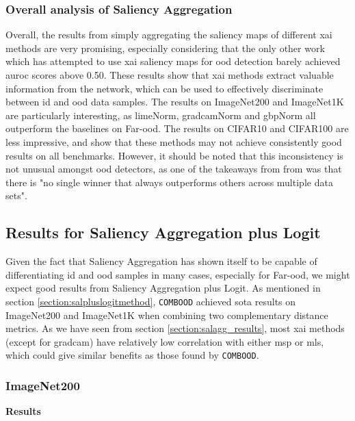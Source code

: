 \documentclass[UKenglish]{uiomasterthesis} %
\theoremstyle{definition}
\begin{document}
\subsubsection{Overall analysis of Saliency Aggregation}

Overall, the results from simply aggregating the saliency maps of different \ac{xai} methods are very promising, especially considering that the only other work which has attempted to use \ac{xai} saliency maps for \ac{ood} detection barely achieved \ac{auroc} scores above 0.50. These results show that \ac{xai} methods extract valuable information from the network, which can be used to effectively discriminate between \ac{id} and \ac{ood} data samples. The results on ImageNet200 and ImageNet1K are particularly interesting, as \ac{lime}Norm, \ac{gradcam}Norm and \ac{gbp}Norm all outperform the baselines on Far-\ac{ood}. The results on CIFAR10 and CIFAR100 are less impressive, and show that these methods may not achieve consistently good results on all benchmarks. However, it should be noted that this inconsistency is not unusual amongst \ac{ood} detectors, as one of the takeaways from from \cite{openood15} was that there is "no single winner that always outperforms others across multiple data sets".

\subsection{Results for Saliency Aggregation plus Logit} \label{section:salagglogits_results}

Given the fact that Saliency Aggregation has shown itself to be capable of differentiating \ac{id} and \ac{ood} samples in many cases, especially for Far-\ac{ood}, we might expect good results from Saliency Aggregation plus Logit. As mentioned in section \ref{section:salpluslogitmethod}, \texttt{COMBOOD} \cite{combood} achieved \ac{sota} results on ImageNet200 and ImageNet1K when combining two complementary distance metrics. As we have seen from section \ref{section:salagg_results}, most \ac{xai} methods (except for \ac{gradcam}) have relatively low correlation with either \ac{msp} or \ac{mls}, which could give similar benefits as those found by \texttt{COMBOOD}.

\subsubsection{ImageNet200}

\noindent \textbf{Results}
\end{document}
